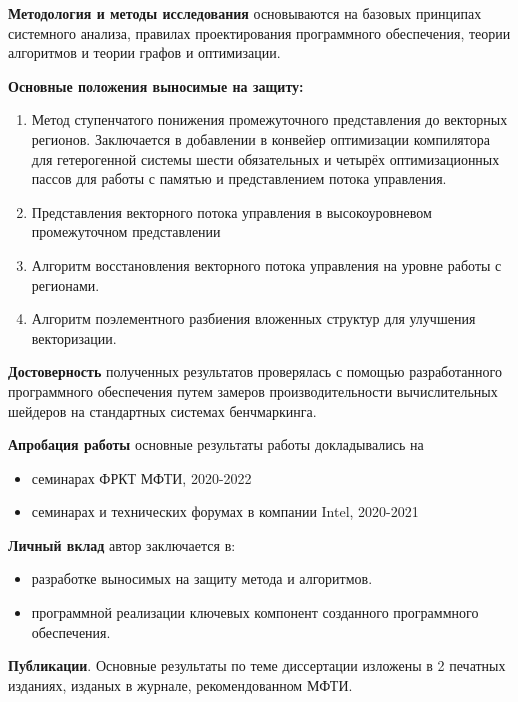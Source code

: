 \textbf{Методология и методы исследования} основываются на базовых принципах системного анализа, правилах проектирования программного обеспечения, теории алгоритмов и теории графов и оптимизации.

\textbf{Основные положения выносимые на защиту:}
\begin{enumerate}[beginpenalty=10000]
  \item Метод ступенчатого понижения промежуточного представления до векторных регионов. Заключается в добавлении в конвейер оптимизации компилятора для гетерогенной системы шести обязательных и четырёх оптимизационных пассов для работы с памятью и представлением потока управления.
  \item Представления векторного потока управления в высокоуровневом промежуточном представлении 
  \item Алгоритм восстановления векторного потока управления на уровне работы с регионами.
  \item Алгоритм поэлементного разбиения вложенных структур для улучшения векторизации.
\end{enumerate}

\textbf{Достоверность} полученных результатов проверялась с помощью разработанного программного обеспечения путем замеров производительности вычислительных шейдеров на стандартных системах бенчмаркинга.

\textbf{Апробация работы} основные результаты работы докладывались на
\begin{itemize}
  \item семинарах ФРКТ МФТИ, 2020-2022
  \item семинарах и технических форумах в компании Intel, 2020-2021
\end{itemize}

\textbf{Личный вклад} автор заключается в:
\begin{itemize}
  \item разработке выносимых на защиту метода и алгоритмов.
  \item программной реализации ключевых компонент созданного программного обеспечения.
\end{itemize}

\textbf{Публикации}. Основные результаты по теме диссертации изложены в 2 печатных изданиях, изданых в журнале, рекомендованном МФТИ.

\iffalse


